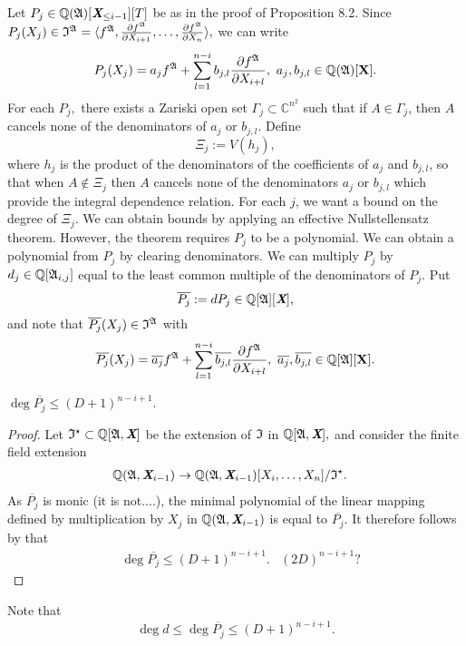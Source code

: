 \documentclass[sigconf]{acmart}
\def\Xb{\textit{\textbf{X}}}
\def\ajb{\overline{a_j}}
\def\bjb{\overline{b_{j,l}}}
\def\pjb{\overline{P_{j}}}
\def\C{\mathbb{C}}
\def\Q{\mathbb{Q}}
\def\I{\frak{I}}
\def\Is{\frak{I}^{\star}}
\def\A{\frak{A}}
\begin{document}
%
Let $P_{j} \in \mathbb{Q}(\frak{A})[\Xb_{\leq i-1}][T]$ be as in the proof of Proposition 8.2. Since $P_{j}(X_j) \in\I^{\A}= \langle f^\A,\frac{\partial f^\A}{\partial X_{i+1}},\hdots,\frac{\partial f^\A}{\partial X_n} \rangle,$
 we can write
\[
P_{j}(X_j) = a_j f^{\A} + \sum_{l=1}^{n-i}b_{j,l} \frac{\partial f^\A}{\partial X_{i+l}}, ~a_j,b_{j,l} \in \mathbb{Q}(\A)[\textbf{X}].
\]
For each $P_j,$ there exists a Zariski open set $\Gamma_j \subset \C^{n^2}$ such that if $A \in \Gamma_j$,
then $A$ cancels none of the denominators of $a_{j}$ or $b_{j,l}$. Define 
\[
\Xi_j:=V(h_j), 
\]
where $h_j$ is the product of the denominators of the coefficients of $a_j$ and $b_{j,l}$, so that when $A \not \in \Xi_j$ then $A$ cancels none of the denominators $a_{j}$ or $b_{j,l}$ which provide the integral dependence relation. For each $j$, we want a bound on the degree of $\Xi_j$. We can obtain bounds by applying an effective Nullstellensatz theorem. However, the theorem requires $P_{j}$ to be a polynomial. We can obtain a polynomial from $P_{j}$ by clearing denominators. We can multiply $P_{j}$ by $d_j \in \Q[\A_{i,j}]$ equal to the least common multiple of the denominators of $P_{j}.$ Put 
\[
\overline{P_{j}} := dP_{j}\in \Q[\A][\textit{\textbf{X}}],
\]
and note that $\pjb(X_j) \in \I^{\A}$ with 
\[
\pjb(X_j) = \ajb f^{\A} + \sum_{l=1}^{n-i}\bjb \frac{\partial f^\A}{\partial X_{i+l}}, ~\ajb,\bjb \in \mathbb{Q}[\A][\textbf{X}].
\]
%
\begin{proposition} 
$\deg \pjb\leq (D+1)^{n-i+1}.$ 
\end{proposition} 
%
\begin{proof}
Let $\Is \subset \Q[\A,\Xb]$ be the extension of $\I$ in  $\Q[\A,\Xb],$ and consider the finite field extension
%
\begin{align*}
    \Q(\A,\Xb_{i-1}) &\rightarrow \Q(\A,\Xb_{i-1})[X_i,\hdots,X_n]/\Is.
\end{align*}
%
As $\pjb$ is monic (it is not....), the minimal polynomial of the linear mapping defined by multiplication by $X_j$ in $\Q(\A,\Xb_{i-1})$ is equal to $\pjb$. It therefore follows by \cite[Proposition 1]{CGR} that
%
\begin{align*}
&\deg \pjb \leq (D+1)^{n-i+1}.&(2D)^{n-i+1}\textrm{?} 
\end{align*}
%
\end{proof}
%
Note that 
\[
\deg d \leq \deg \pjb \leq (D+1)^{n-i+1}.
\]
%
%
%
%
\end{document}

